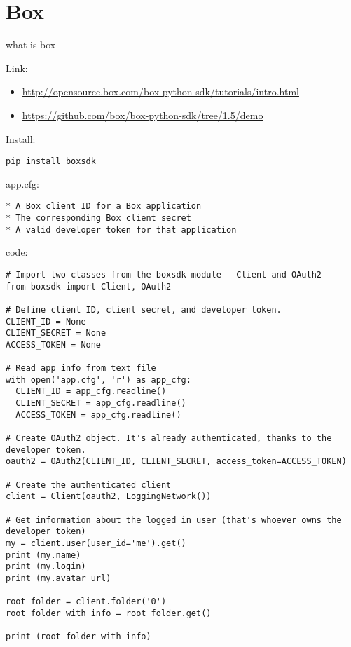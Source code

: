 \section{Box}\label{box}

what is box

Link:

\begin{itemize}

\item
  \url{http://opensource.box.com/box-python-sdk/tutorials/intro.html}
\item
  \url{https://github.com/box/box-python-sdk/tree/1.5/demo}
\end{itemize}

Install:

\begin{verbatim}
pip install boxsdk
\end{verbatim}

app.cfg:

\begin{verbatim}
* A Box client ID for a Box application
* The corresponding Box client secret
* A valid developer token for that application
\end{verbatim}

code:

\begin{verbatim}
# Import two classes from the boxsdk module - Client and OAuth2
from boxsdk import Client, OAuth2

# Define client ID, client secret, and developer token.
CLIENT_ID = None
CLIENT_SECRET = None
ACCESS_TOKEN = None

# Read app info from text file
with open('app.cfg', 'r') as app_cfg:
  CLIENT_ID = app_cfg.readline()
  CLIENT_SECRET = app_cfg.readline()
  ACCESS_TOKEN = app_cfg.readline()

# Create OAuth2 object. It's already authenticated, thanks to the developer token.
oauth2 = OAuth2(CLIENT_ID, CLIENT_SECRET, access_token=ACCESS_TOKEN)

# Create the authenticated client
client = Client(oauth2, LoggingNetwork())

# Get information about the logged in user (that's whoever owns the developer token)
my = client.user(user_id='me').get()
print (my.name)
print (my.login)
print (my.avatar_url)

root_folder = client.folder('0')
root_folder_with_info = root_folder.get()

print (root_folder_with_info)
\end{verbatim}

